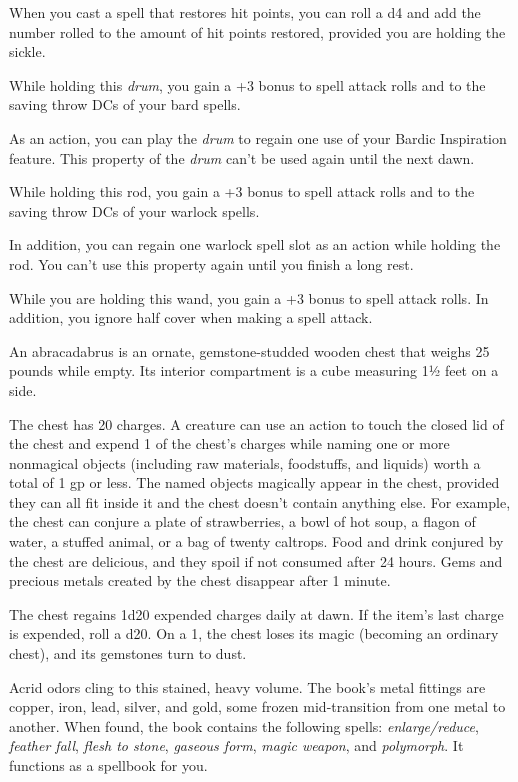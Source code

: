 \documentclass[10pt,a4paper,twoside,bg=print,twocolumn,openany,nodeprecatedcode]{dndbook}
\begin{document}
When you cast a spell that restores hit points, you can roll a d4 and add the number rolled to the amount of hit points restored, provided you are holding the sickle.

While holding this \textit{drum}, you gain a +3 bonus to spell attack rolls and to the saving throw DCs of your bard spells.

As an action, you can play the \textit{drum} to regain one use of your Bardic Inspiration feature. This property of the \textit{drum} can't be used again until the next dawn.

While holding this rod, you gain a +3 bonus to spell attack rolls and to the saving throw DCs of your warlock spells.

In addition, you can regain one warlock spell slot as an action while holding the rod. You can't use this property again until you finish a long rest.

While you are holding this wand, you gain a +3 bonus to spell attack rolls. In addition, you ignore half cover when making a spell attack.

An abracadabrus is an ornate, gemstone-studded wooden chest that weighs 25 pounds while empty. Its interior compartment is a cube measuring 1½ feet on a side.

The chest has 20 charges. A creature can use an action to touch the closed lid of the chest and expend 1 of the chest's charges while naming one or more nonmagical objects (including raw materials, foodstuffs, and liquids) worth a total of 1 gp or less. The named objects magically appear in the chest, provided they can all fit inside it and the chest doesn't contain anything else. For example, the chest can conjure a plate of strawberries, a bowl of hot soup, a flagon of water, a stuffed animal, or a bag of twenty caltrops. Food and drink conjured by the chest are delicious, and they spoil if not consumed after 24 hours. Gems and precious metals created by the chest disappear after 1 minute.

The chest regains 1d20 expended charges daily at dawn. If the item's last charge is expended, roll a d20. On a 1, the chest loses its magic (becoming an ordinary chest), and its gemstones turn to dust.

Acrid odors cling to this stained, heavy volume. The book's metal fittings are copper, iron, lead, silver, and gold, some frozen mid-transition from one metal to another. When found, the book contains the following spells: \textit{enlarge/reduce}, \textit{feather fall}, \textit{flesh to stone}, \textit{gaseous form}, \textit{magic weapon}, and \textit{polymorph}. It functions as a spellbook for you.
\end{document}
